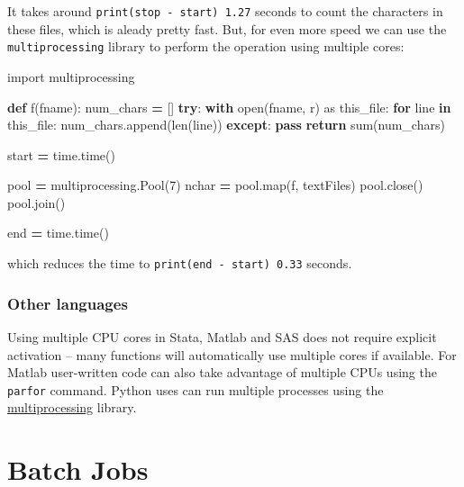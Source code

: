 \documentclass[
]{book}
\newenvironment{Shaded}{\begin{snugshade}}{\end{snugshade}}
\newcommand{\BuiltInTok}[1]{#1}
\newcommand{\ControlFlowTok}[1]{\textcolor[rgb]{0.13,0.29,0.53}{\textbf{#1}}}
\newcommand{\DecValTok}[1]{\textcolor[rgb]{0.00,0.00,0.81}{#1}}
\newcommand{\ImportTok}[1]{#1}
\newcommand{\KeywordTok}[1]{\textcolor[rgb]{0.13,0.29,0.53}{\textbf{#1}}}
\newcommand{\NormalTok}[1]{#1}
\newcommand{\OperatorTok}[1]{\textcolor[rgb]{0.81,0.36,0.00}{\textbf{#1}}}
\newcommand{\StringTok}[1]{\textcolor[rgb]{0.31,0.60,0.02}{#1}}
\begin{document}
It takes around \texttt{print(stop\ -\ start)\ 1.27} seconds to
count the characters in these files, which is aleady pretty fast. But,
for even more speed we can use the \texttt{multiprocessing} library to perform
the operation using multiple cores:

\begin{Shaded}
\begin{Highlighting}[]
\ImportTok{import}\NormalTok{ multiprocessing}

\KeywordTok{def}\NormalTok{ f(fname):}
\NormalTok{    num\_chars }\OperatorTok{=}\NormalTok{ []}
    \ControlFlowTok{try}\NormalTok{:}
        \ControlFlowTok{with} \BuiltInTok{open}\NormalTok{(fname, }\StringTok{\textquotesingle{}r\textquotesingle{}}\NormalTok{) }\ImportTok{as}\NormalTok{ this\_file:}
            \ControlFlowTok{for}\NormalTok{ line }\KeywordTok{in}\NormalTok{ this\_file:}
\NormalTok{                num\_chars.append(}\BuiltInTok{len}\NormalTok{(line))}
    \ControlFlowTok{except}\NormalTok{:}
        \ControlFlowTok{pass}
    \ControlFlowTok{return} \BuiltInTok{sum}\NormalTok{(num\_chars)}

\NormalTok{start }\OperatorTok{=}\NormalTok{ time.time()}

\NormalTok{pool }\OperatorTok{=}\NormalTok{ multiprocessing.Pool(}\DecValTok{7}\NormalTok{)}
\NormalTok{nchar }\OperatorTok{=}\NormalTok{ pool.}\BuiltInTok{map}\NormalTok{(f, textFiles)}
\NormalTok{pool.close()}
\NormalTok{pool.join()}

\NormalTok{end }\OperatorTok{=}\NormalTok{ time.time()}
\end{Highlighting}
\end{Shaded}

which reduces the time to \texttt{print(end\ -\ start)\ 0.33} seconds.

\hypertarget{other-languages}{%
\subsection{Other languages}\label{other-languages}}

Using multiple CPU cores in Stata, Matlab and SAS does not require
explicit activation -- many functions will automatically use multiple
cores if available. For Matlab user-written code can also take advantage
of multiple CPUs using the \texttt{parfor} command. Python uses can run
multiple processes using the
\href{https://docs.python.org/2/library/multiprocessing.html}{multiprocessing}
library.

\hypertarget{batch-jobs}{%
\chapter{Batch Jobs}\label{batch-jobs}}
\end{document}
